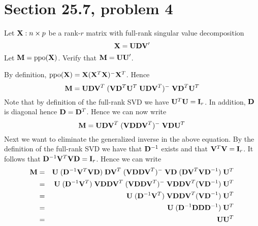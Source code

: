 \section{Section 25.7, problem 4}
Let ${\bf X}: n\times p$ be a rank-$r$ matrix with full-rank
singular value decomposition
$${\bf X}={\bf UDV}'$$
Let ${\bf M}=\mathop{\rm ppo}(\bf X)$.
Verify that ${\bf M}={\bf UU}'$.

\bigskip
\noindent
By definition,
$\mathop{\rm ppo}({\bf X})={\bf X}({\bf X}^T{\bf X})^{-{}}{\bf X}^T$.
Hence
$$
{\bf M}={\bf UDV}^T\;
({\bf V}{\bf D}^T{\bf U}^T\;{\bf UDV}^T)^{-{}}\;
{\bf VD}^T{\bf U}^T
$$
Note that by definition of the full-rank SVD we have
${\bf U}^T{\bf U}={\bf I}_r$.
In addition, $\bf D$ is diagonal hence ${\bf D}={\bf D}^T$.
Hence we can now write
$$
{\bf M}={\bf UDV}^T\;
({\bf V}{\bf D}{\bf DV}^T)^{-{}}\;
{\bf VD}{\bf U}^T
$$
Next we want to eliminate the generalized inverse in the
above equation.
By the definition of the full-rank SVD we have that
${\bf D}^{-1}$ exists and that
${\bf V}^T{\bf V}={\bf I}_r$.
It follows that ${\bf D}^{-1}{\bf V}^T{\bf VD}={\bf I}_r$.
Hence we can write
\begin{eqnarray*}
{\bf M}&=&
{\bf U}\;
({\bf D}^{-1}{\bf V}^T{\bf VD})\;
{\bf DV}^T\;
({\bf V}{\bf D}{\bf DV}^T)^{-{}}\;
{\bf VD}\;
({\bf DV}^T{\bf VD}^{-1})\;
{\bf U}^T\\
&=&
{\bf U}\;
({\bf D}^{-1}{\bf V}^T)\;
{\bf VDDV}^T\;
({\bf V}{\bf D}{\bf DV}^T)^{-{}}\;
{\bf VDDV}^T
({\bf VD}^{-1})\;
{\bf U}^T\\
&=&
{\bf U}\;
({\bf D}^{-1}{\bf V}^T)\;
{\bf VDDV}^T
({\bf VD}^{-1})\;
{\bf U}^T\\
&=&
{\bf U}\;
({\bf D}^{-1}{\bf DD}{\bf D}^{-1})\;
{\bf U}^T\\
&=&{\bf UU}^T
\end{eqnarray*}
